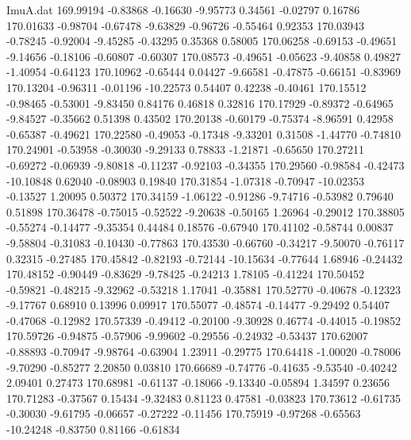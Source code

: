 \begin{filecontents}{ImuA.dat}
 169.99194   -0.83868   -0.16630   -9.95773    0.34561   -0.02797    0.16786
 170.01633   -0.98704   -0.67478   -9.63829   -0.96726   -0.55464    0.92353
 170.03943   -0.78245   -0.92004   -9.45285   -0.43295    0.35368    0.58005
 170.06258   -0.69153   -0.49651   -9.14656   -0.18106   -0.60807   -0.60307
 170.08573   -0.49651   -0.05623   -9.40858    0.49827   -1.40954   -0.64123
 170.10962   -0.65444    0.04427   -9.66581   -0.47875   -0.66151   -0.83969
 170.13204   -0.96311   -0.01196  -10.22573    0.54407    0.42238   -0.40461
 170.15512   -0.98465   -0.53001   -9.83450    0.84176    0.46818    0.32816
 170.17929   -0.89372   -0.64965   -9.84527   -0.35662    0.51398    0.43502
 170.20138   -0.60179   -0.75374   -8.96591    0.42958   -0.65387   -0.49621
 170.22580   -0.49053   -0.17348   -9.33201    0.31508   -1.44770   -0.74810
 170.24901   -0.53958   -0.30030   -9.29133    0.78833   -1.21871   -0.65650
 170.27211   -0.69272   -0.06939   -9.80818   -0.11237   -0.92103   -0.34355
 170.29560   -0.98584   -0.42473  -10.10848    0.62040   -0.08903    0.19840
 170.31854   -1.07318   -0.70947  -10.02353   -0.13527    1.20095    0.50372
 170.34159   -1.06122   -0.91286   -9.74716   -0.53982    0.79640    0.51898
 170.36478   -0.75015   -0.52522   -9.20638   -0.50165    1.26964   -0.29012
 170.38805   -0.55274   -0.14477   -9.35354    0.44484    0.18576   -0.67940
 170.41102   -0.58744    0.00837   -9.58804   -0.31083   -0.10430   -0.77863
 170.43530   -0.66760   -0.34217   -9.50070   -0.76117    0.32315   -0.27485
 170.45842   -0.82193   -0.72144  -10.15634   -0.77644    1.68946   -0.24432
 170.48152   -0.90449   -0.83629   -9.78425   -0.24213    1.78105   -0.41224
 170.50452   -0.59821   -0.48215   -9.32962   -0.53218    1.17041   -0.35881
 170.52770   -0.40678   -0.12323   -9.17767    0.68910    0.13996    0.09917
 170.55077   -0.48574   -0.14477   -9.29492    0.54407   -0.47068   -0.12982
 170.57339   -0.49412   -0.20100   -9.30928    0.46774   -0.44015   -0.19852
 170.59726   -0.94875   -0.57906   -9.99602   -0.29556   -0.24932   -0.53437
 170.62007   -0.88893   -0.70947   -9.98764   -0.63904    1.23911   -0.29775
 170.64418   -1.00020   -0.78006   -9.70290   -0.85277    2.20850    0.03810
 170.66689   -0.74776   -0.41635   -9.53540   -0.40242    2.09401    0.27473
 170.68981   -0.61137   -0.18066   -9.13340   -0.05894    1.34597    0.23656
 170.71283   -0.37567    0.15434   -9.32483    0.81123    0.47581   -0.03823
 170.73612   -0.61735   -0.30030   -9.61795   -0.06657   -0.27222   -0.11456
 170.75919   -0.97268   -0.65563  -10.24248   -0.83750    0.81166   -0.61834

\end{filecontents}
